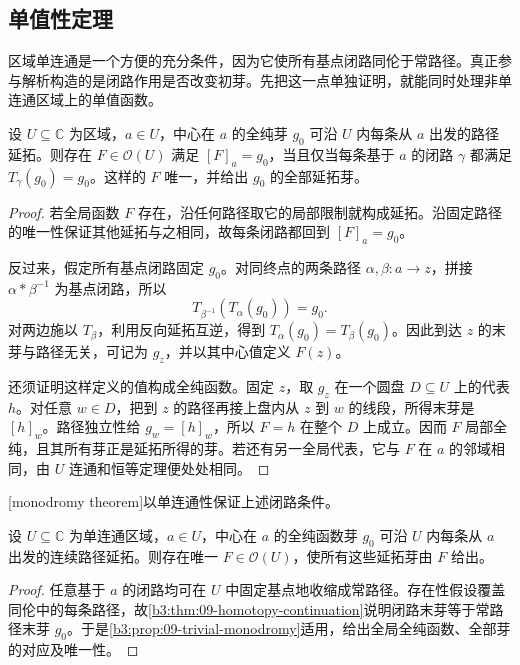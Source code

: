 \subsection{单值性定理}
\label{b3:subsec:090302}

区域单连通是一个方便的充分条件，因为它使所有基点闭路同伦于常路径。真正参与解析构造的是闭路作用是否改变初芽。先把这一点单独证明，就能同时处理非单连通区域上的单值函数。

\begin{proposition}[平凡闭路作用与全局单值性]\label{b3:prop:09-trivial-monodromy}
设 \(U\subseteq\mathbb C\) 为区域，\(a\in U\)，中心在 \(a\) 的全纯芽 \(g_0\) 可沿 \(U\) 内每条从 \(a\) 出发的路径延拓。则存在 \(F\in\mathcal O(U)\) 满足 \([F]_a=g_0\)，当且仅当每条基于 \(a\) 的闭路 \(\gamma\) 都满足 \(T_\gamma(g_0)=g_0\)。这样的 \(F\) 唯一，并给出 \(g_0\) 的全部延拓芽。
\end{proposition}
\begin{proof}
若全局函数 \(F\) 存在，沿任何路径取它的局部限制就构成延拓。沿固定路径的唯一性保证其他延拓与之相同，故每条闭路都回到 \([F]_a=g_0\)。

反过来，假定所有基点闭路固定 \(g_0\)。对同终点的两条路径 \(\alpha,\beta:a\rightarrow z\)，拼接 \(\alpha*\beta^{-1}\) 为基点闭路，所以
\[
 T_{\beta^{-1}}(T_\alpha(g_0))=g_0.
\]
对两边施以 \(T_\beta\)，利用反向延拓互逆，得到 \(T_\alpha(g_0)=T_\beta(g_0)\)。因此到达 \(z\) 的末芽与路径无关，可记为 \(g_z\)，并以其中心值定义 \(F(z)\)。

还须证明这样定义的值构成全纯函数。固定 \(z\)，取 \(g_z\) 在一个圆盘 \(D\subseteq U\) 上的代表 \(h\)。对任意 \(w\in D\)，把到 \(z\) 的路径再接上盘内从 \(z\) 到 \(w\) 的线段，所得末芽是 \([h]_w\)。路径独立性给 \(g_w=[h]_w\)，所以 \(F=h\) 在整个 \(D\) 上成立。因而 \(F\) 局部全纯，且其所有芽正是延拓所得的芽。若还有另一全局代表，它与 \(F\) 在 \(a\) 的邻域相同，由 \(U\) 连通和恒等定理便处处相同。
\end{proof}

[monodromy theorem]以单连通性保证上述闭路条件。

\begin{theorem}[单值性定理]\label{b3:thm:09-monodromy}
设 \(U\subseteq\mathbb C\) 为单连通区域，\(a\in U\)，中心在 \(a\) 的全纯函数芽 \(g_0\) 可沿 \(U\) 内每条从 \(a\) 出发的连续路径延拓。则存在唯一 \(F\in\mathcal O(U)\)，使所有这些延拓芽由 \(F\) 给出。
\end{theorem}
\begin{proof}
任意基于 \(a\) 的闭路均可在 \(U\) 中固定基点地收缩成常路径。存在性假设覆盖同伦中的每条路径，故\cref{b3:thm:09-homotopy-continuation}说明闭路末芽等于常路径末芽 \(g_0\)。于是\cref{b3:prop:09-trivial-monodromy}适用，给出全局全纯函数、全部芽的对应及唯一性。
\end{proof}

